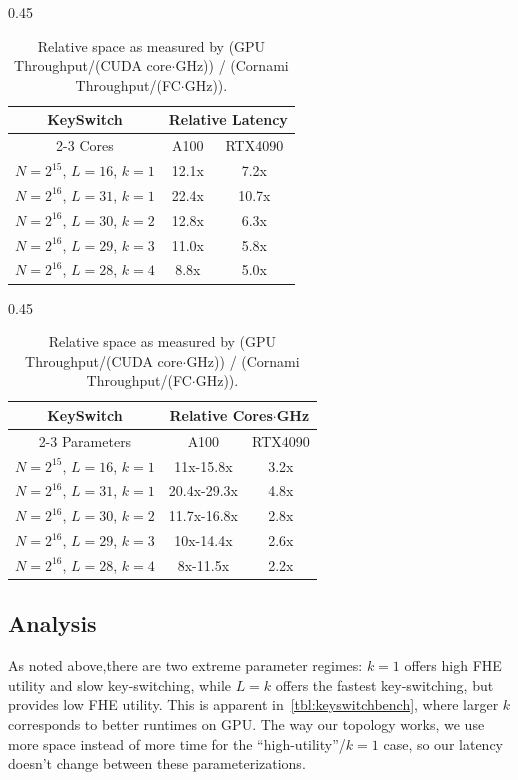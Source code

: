 \documentclass{article}
\begin{document}
\begin{table}[H]
		\begin{subtable}[b]{0.45\textwidth}
			\centering
			\caption{Relative performance as measured by (GPU Throughput/CUDA core) / (Cornami Throughput/FC).}
			\begin{tabular}{ | c | c | c | }
				\hline
				KeySwitch & \multicolumn{2}{c|}{Relative Latency} \\ \cline{2-3}
				Cores & A100 & RTX4090 \\
				\hline
				$N=2^{15}$, $L=16$, $k=1$ & 12.1x & 7.2x \\
				$N=2^{16}$, $L=31$, $k=1$ & 22.4x & 10.7x \\
				$N=2^{16}$, $L=30$, $k=2$ & 12.8x & 6.3x \\
				$N=2^{16}$, $L=29$, $k=3$ & 11.0x & 5.8x \\
				$N=2^{16}$, $L=28$, $k=4$ & 8.8x  & 5.0x \\
				\hline
			\end{tabular}
		\end{subtable}
		\hfill %
		\begin{subtable}[b]{0.45\textwidth}
			\centering
			\caption{Relative space as measured by (GPU Throughput/(CUDA core$\cdot$GHz)) / (Cornami Throughput/(FC$\cdot$GHz)).}
			\begin{tabular}{ | c | c | c | }
				\hline
				KeySwitch & \multicolumn{2}{c|}{Relative Cores$\cdot$GHz} \\ \cline{2-3}
				Parameters & A100 & RTX4090 \\
				\hline
				$N=2^{15}$, $L=16$, $k=1$ & 11x-15.8x & 3.2x \\
				$N=2^{16}$, $L=31$, $k=1$ & 20.4x-29.3x & 4.8x \\
				$N=2^{16}$, $L=30$, $k=2$ & 11.7x-16.8x & 2.8x \\
				$N=2^{16}$, $L=29$, $k=3$ & 10x-14.4x & 2.6x \\
				$N=2^{16}$, $L=28$, $k=4$ & 8x-11.5x & 2.2x \\
				\hline
			\end{tabular}
		\end{subtable}
	\end{table}
	
	\subsection{Analysis}	
	As noted above,there are two extreme parameter regimes: $k=1$ offers high FHE utility and slow key-switching, while $L=k$ offers the fastest key-switching, but provides low FHE utility. This is apparent in~\cref{tbl:keyswitchbench}, where larger $k$ corresponds to better runtimes on GPU. The way our topology works, we use more space instead of more time for the ``high-utility''/$k=1$ case, so our latency doesn't change between these parameterizations.
	
\end{document}
